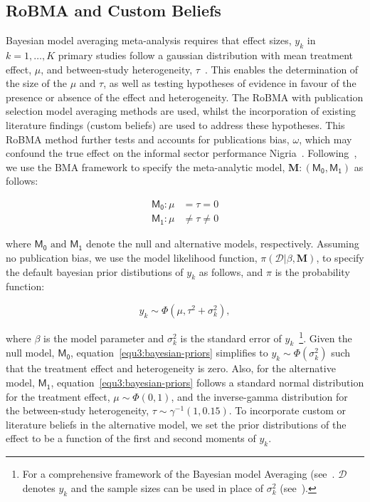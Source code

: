 \documentclass[a4paper, 12pt]{article}
\begin{document}
    \subsection{RoBMA and Custom Beliefs}\label{sec2.3:robma-custom-beliefs}
    Bayesian model averaging meta-analysis requires that effect sizes, $y_k$ in $k = 1, \dots, K$ primary studies follow a gaussian distribution with mean treatment effect, $\mu$, and between-study heterogeneity, $\tau$~\parencite{bartos2021bma}. This enables the determination of the size of the $\mu$ and $\tau$, as well as testing hypotheses of evidence in favour of the presence or absence of the effect and heterogeneity. The RoBMA with publication selection model averaging methods are used, whilst the incorporation of existing literature findings (custom beliefs) are used to address these hypotheses. This RoBMA method further tests and accounts for publications bias, $\omega$, which may confound the true effect on the informal sector performance Nigria~\parencite{maier2022, bartos2021}. Following~\parencite{maier2022, bartos2021}, we use the BMA framework to specify the meta-analytic model, $\mathbf{M}: (\mathsf{M_0}, \mathsf{M_1})$ as follows:

    \begin{align}
        \mathsf{M_0}: \mu &= \tau = 0 \label{equ1:bma-null-model} \\
        \mathsf{M_1}: \mu &\neq \tau \neq 0 \label{equ2:bma-alt-model}
    \end{align}

    where $\mathsf{M_0} \text{ and } \mathsf{M_1}$ denote the null and alternative models, respectively. Assuming no publication bias, we use the model likelihood function, $\pi \left(\mathcal{D} | \beta, \mathbf{M} \right)$, to specify the default bayesian prior distibutions of $y_k$ as follows, and $\pi$ is the probability function:

    \begin{equation}
        \label{equ3:bayesian-priors}
        y_k \sim \Phi \left (\mu, \tau^{2} + \sigma_k^{2} \right),
    \end{equation}

    where $\beta$ is the model parameter and $\sigma_k^2$ is the standard error of $y_k$~\footnote{For a comprehensive framework of the Bayesian model Averaging (see~\parencite{fragoso2018, gronau2021, hinne2020}. $\mathcal{D}$ denotes $y_k$ and the sample sizes can be used in place of $\sigma_k^{2}$ (see~\cite{bem2011}).}. Given the null model, $\mathsf{M_0}$, equation~\ref{equ3:bayesian-priors} simplifies to $y_k \sim \Phi(\sigma_k^{2})$ such that the treatment effect and heterogeneity is zero. Also, for the alternative model, $\mathsf{M_1}$, equation~\ref{equ3:bayesian-priors} follows a standard normal distribution for the treatment effect, $\mu \sim \Phi(0,1)$, and the inverse-gamma distribution for the between-study heterogeneity, $\tau \sim \gamma^{-1}(1,0.15)$. To incorporate custom or literature beliefs in the alternative model, we set the prior distributions of the effect to be a function of the first and second moments of $y_k$.
\end{document}
